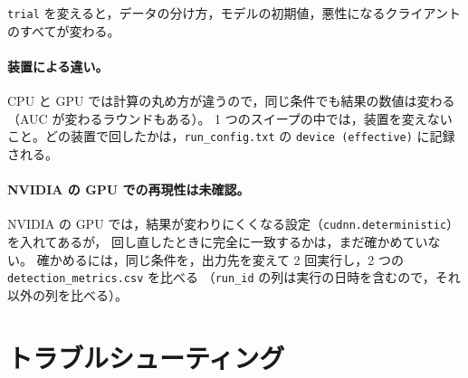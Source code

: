\documentclass[a4j, dvipdfmx]{jsarticle}  %
\begin{document}
\texttt{trial} を変えると，データの分け方，モデルの初期値，悪性になるクライアントのすべてが変わる。

\paragraph{装置による違い。}
CPU と GPU では計算の丸め方が違うので，同じ条件でも結果の数値は変わる（AUC が変わるラウンドもある）。
1 つのスイープの中では，装置を変えないこと。どの装置で回したかは，\texttt{run\_config.txt} の \texttt{device (effective)} に記録される。

\paragraph{NVIDIA の GPU での再現性は未確認。}
NVIDIA の GPU では，結果が変わりにくくなる設定（\texttt{cudnn.deterministic}）を入れてあるが，
回し直したときに完全に一致するかは，まだ確かめていない。
確かめるには，同じ条件を，出力先を変えて 2 回実行し，2 つの \texttt{detection\_metrics.csv} を比べる
（\texttt{run\_id} の列は実行の日時を含むので，それ以外の列を比べる）。

\section{トラブルシューティング}
\end{document}
